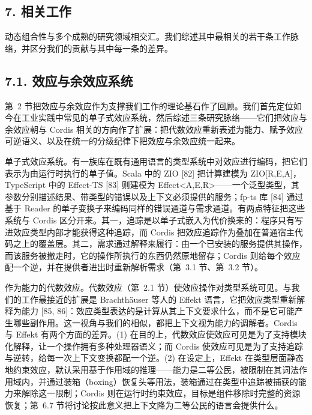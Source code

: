 \subsection{7. 相关工作}\label{related-work}

动态组合性与多个成熟的研究领域相交汇。我们综述其中最相关的若干条工作脉络，并区分我们的贡献与其中每一条的差异。

\subsection{7.1. 效应与余效应系统}\label{efect-and-coefect-systems}

第~2 节把效应与余效应作为支撑我们工作的理论基石作了回顾。我们首先定位如今在工业实践中常见的单子式效应系统，然后综述三条研究脉络——它们把效应与余效应朝与 Cordis 相关的方向作了扩展：把代数效应重新表述为能力、赋予效应可逆语义、以及在统一的分级纪律下把效应与余效应统一起来。

单子式效应系统。有一族库在既有通用语言的类型系统中对效应进行编码，把它们表示为由运行时执行的单子值。Scala 中的 ZIO {[}82{]} 把计算建模为 ZIO{[}R,E,A{]}，TypeScript 中的 Effect-TS {[}83{]} 则建模为 Effect\textless A,E,R\textgreater——一个泛型类型，其参数分别描述结果、带类型的错误以及上下文必须提供的服务；fp-ts 库 {[}84{]} 通过基于 Reader 的单子变换子来编码同样的错误通道与需求通道。有两点特征把这些系统与 Cordis 区分开来。其一，追踪是以单子式嵌入为代价换来的：程序只有写进效应类型内部才能获得这种追踪，而 Cordis 把效应追踪作为叠加在普通宿主代码之上的覆盖层。其二，需求通过解释来履行：由一个已安装的服务提供其操作，而该服务被撤走时，它的操作所执行的东西仍然原地留存；Cordis 则给每个效应配一个逆，并在提供者进出时重新解析需求（第~3.1 节、第~3.2 节）。

作为能力的代数效应。代数效应（第~2.1 节）使效应操作对类型系统可见。与我们的工作最接近的扩展是 Brachthäuser 等人的 Effekt 语言，它把效应类型重新解释为能力 {[}85, 86{]}：效应类型表达的是计算从其上下文要求什么，而不是它可能产生哪些副作用。这一视角与我们的相似，都把上下文视为能力的调解者。Cordis 与 Effekt 有两个方面的差异。(1) 在目的上，代数效应使效应可见是为了支持模块化解释，让一个操作拥有多种处理器语义；而 Cordis 使效应可见是为了支持追踪与逆转，给每一次上下文变换都配一个逆。(2) 在设定上，Effekt 在类型层面静态地约束效应，默认采用基于作用域的推理——能力是二等公民，被限制在其词法作用域内，并通过装箱（boxing）恢复头等用法，装箱通过在类型中追踪被捕获的能力来解除这一限制；Cordis 则在运行时约束效应，目标是组件移除时完整的资源恢复；第~6.7 节将讨论按此意义把上下文降为二等公民的语言会提供什么。

